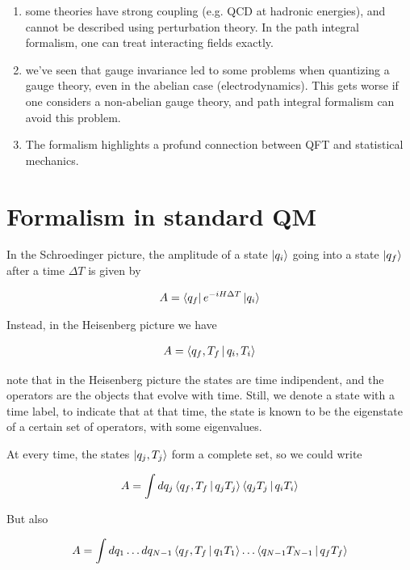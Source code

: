 \documentclass{report}
\begin{document}
\begin{enumerate}
    \item some theories have strong coupling (e.g. QCD at hadronic energies), and cannot be described using perturbation theory. In the path integral formalism, one can treat interacting fields exactly. 
    \item we've seen that gauge invariance led to some problems when quantizing a gauge theory, even in the abelian case (electrodynamics). This gets worse if one considers a non-abelian gauge theory, and path integral formalism can avoid this problem. 
    \item The formalism highlights a profund connection between QFT and statistical mechanics. 
\end{enumerate}

\section{Formalism in standard QM}

In the Schroedinger picture, the amplitude of a state \(\ket{q_i}\) going into a state \(\ket{q_f}\) after a time \(\Delta T\) is given by 

\begin{align}
    A = \bra{q_f}e^{-iH\Delta T}\ket{q_i}
\end{align}

Instead, in the Heisenberg picture we have 

\begin{align}
    A = \Braket{q_f, T_f| q_i, T_i}
\end{align}

note that in the Heisenberg picture the states are time indipendent, and the operators are the objects that evolve with time. Still, we denote a state with a time label, to indicate that at that time, the state is known to be the eigenstate of a certain set of operators, with some eigenvalues. 

At every time, the states \(\ket{q_j, T_j}\) form a complete set, so we could write 

\begin{align}
    A = \int dq_j \Braket{q_f, T_f | q_j T_j}\Braket{q_j T_j | q_i T_i}
\end{align}

But also 

\begin{align}
    A = \int dq_1\ldots dq_{N-1}\Braket{q_f, T_f | q_1 T_1}\ldots \Braket{q_{N-1} T_{N-1} | q_f T_f}
\end{align}
\end{document}
